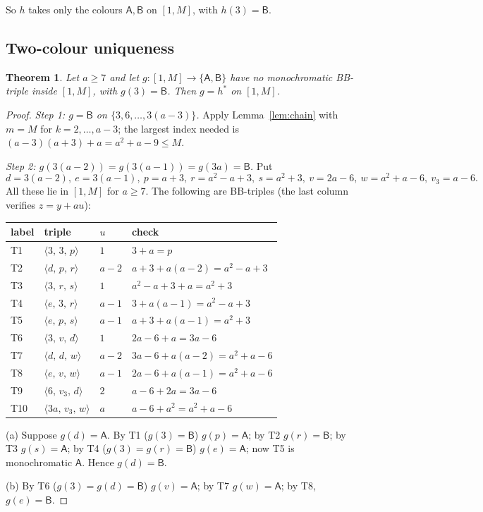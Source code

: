 \documentclass[11pt]{amsart}
\newtheorem{theorem}{Theorem}[section]
\theoremstyle{definition}
\theoremstyle{remark}
\newcommand{\cA}{\mathsf{A}}\newcommand{\cB}{\mathsf{B}}\newcommand{\cC}{\mathsf{C}}
\newcommand{\tri}[3]{\langle #1,\,#2,\,#3\rangle}
\begin{document}
So $h$ takes only the colours $\cA,\cB$ on $[1,M]$, with $h(3)=\cB$.

\subsection{Two-colour uniqueness}
\begin{theorem}\label{thm:u2c}
Let $a\ge7$ and let $g\colon[1,M]\to\{\cA,\cB\}$ have no monochromatic BB-triple inside $[1,M]$, with $g(3)=\cB$. Then
$g=h^\ast$ on $[1,M]$.
\end{theorem}
\begin{proof}
\emph{Step 1: $g=\cB$ on $\{3,6,\dots,3(a-3)\}$.} Apply Lemma~\ref{lem:chain} with $m=M$ for $k=2,\dots,a-3$; the
largest index needed is $(a-3)(a+3)+a=a^2+a-9\le M$.

\emph{Step 2: $g(3(a-2))=g(3(a-1))=g(3a)=\cB$.} Put
\[d=3(a-2),\ e=3(a-1),\ p=a+3,\ r=a^2-a+3,\ s=a^2+3,\ v=2a-6,\ w=a^2+a-6,\ v_3=a-6 .\]
All these lie in $[1,M]$ for $a\ge7$. The following are BB-triples (the last column verifies $z=y+au$):
\begin{center}\begin{tabular}{llll}\toprule
label & triple & $u$ & check\\\midrule
T1 & $\tri{3}{3}{p}$ & $1$ & $3+a=p$\\
T2 & $\tri{d}{p}{r}$ & $a-2$ & $a+3+a(a-2)=a^2-a+3$\\
T3 & $\tri{3}{r}{s}$ & $1$ & $a^2-a+3+a=a^2+3$\\
T4 & $\tri{e}{3}{r}$ & $a-1$ & $3+a(a-1)=a^2-a+3$\\
T5 & $\tri{e}{p}{s}$ & $a-1$ & $a+3+a(a-1)=a^2+3$\\
T6 & $\tri{3}{v}{d}$ & $1$ & $2a-6+a=3a-6$\\
T7 & $\tri{d}{d}{w}$ & $a-2$ & $3a-6+a(a-2)=a^2+a-6$\\
T8 & $\tri{e}{v}{w}$ & $a-1$ & $2a-6+a(a-1)=a^2+a-6$\\
T9 & $\tri{6}{v_3}{d}$ & $2$ & $a-6+2a=3a-6$\\
T10 & $\tri{3a}{v_3}{w}$ & $a$ & $a-6+a^2=a^2+a-6$\\\bottomrule
\end{tabular}\end{center}
(a) Suppose $g(d)=\cA$. By T1 ($g(3)=\cB$) $g(p)=\cA$; by T2 $g(r)=\cB$; by T3 $g(s)=\cA$; by T4 ($g(3)=g(r)=\cB$)
$g(e)=\cA$; now T5 is monochromatic $\cA$. Hence $g(d)=\cB$.

(b) By T6 ($g(3)=g(d)=\cB$) $g(v)=\cA$; by T7 $g(w)=\cA$; by T8, $g(e)=\cB$.


\end{proof}
\end{document}
